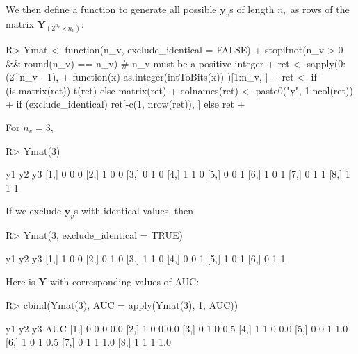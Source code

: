\documentclass[
]{jss}
\begin{document}
We then define a function to generate all possible \(\mathbf{y}_v\)s of
length \(n_v\) as rows of the matrix
\(\mathbf{Y}_{(2^{n_v} \times n_v)}\):

\begin{CodeChunk}
\begin{CodeInput}
R> Ymat <- function(n_v, exclude_identical = FALSE) {
+   stopifnot(n_v > 0 && round(n_v) == n_v)    # n_v must be a positive integer
+   ret <- sapply(0:(2^n_v - 1),
+                 function(x) as.integer(intToBits(x)) )[1:n_v, ]
+   ret <- if (is.matrix(ret)) t(ret) else matrix(ret)
+   colnames(ret) <- paste0("y", 1:ncol(ret))
+   if (exclude_identical) ret[-c(1, nrow(ret)), ] else ret
+ }
\end{CodeInput}
\end{CodeChunk}

For \(n_v=3\),

\begin{CodeChunk}
\begin{CodeInput}
R> Ymat(3)
\end{CodeInput}
\begin{CodeOutput}
     y1 y2 y3
[1,]  0  0  0
[2,]  1  0  0
[3,]  0  1  0
[4,]  1  1  0
[5,]  0  0  1
[6,]  1  0  1
[7,]  0  1  1
[8,]  1  1  1
\end{CodeOutput}
\end{CodeChunk}

If we exclude \(\mathbf{y}_v\)s with identical values, then

\begin{CodeChunk}
\begin{CodeInput}
R> Ymat(3, exclude_identical = TRUE)
\end{CodeInput}
\begin{CodeOutput}
     y1 y2 y3
[1,]  1  0  0
[2,]  0  1  0
[3,]  1  1  0
[4,]  0  0  1
[5,]  1  0  1
[6,]  0  1  1
\end{CodeOutput}
\end{CodeChunk}

Here is \(\mathbf{Y}\) with corresponding values of AUC:

\begin{CodeChunk}
\begin{CodeInput}
R> cbind(Ymat(3), AUC = apply(Ymat(3), 1, AUC))
\end{CodeInput}
\begin{CodeOutput}
     y1 y2 y3 AUC
[1,]  0  0  0 0.0
[2,]  1  0  0 0.0
[3,]  0  1  0 0.5
[4,]  1  1  0 0.0
[5,]  0  0  1 1.0
[6,]  1  0  1 0.5
[7,]  0  1  1 1.0
[8,]  1  1  1 1.0
\end{CodeOutput}
\end{CodeChunk}
\end{document}
